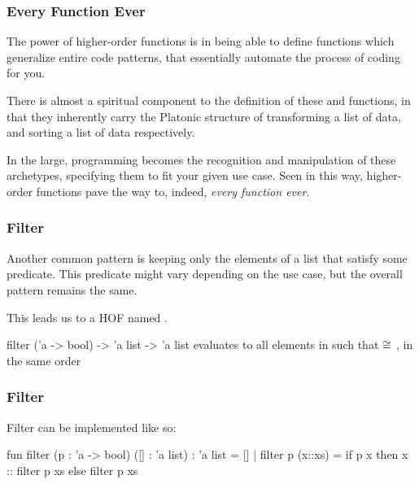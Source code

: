 \documentclass[aspectratio=169]{beamer}
\begin{document}
\begin{frame}[fragile]
  \frametitle{Every Function Ever}

  The power of higher-order functions is in being able to define functions
  which generalize entire code patterns, that essentially automate the process
  of coding for you.

  \pause
  \vspace{\fill}

  There is almost a spiritual component to the definition of these
   and  functions, in that they inherently carry the
  Platonic structure of transforming a list of data, and sorting a list of
  data respectively.

  \pause
  \vspace{\fill}

  In the large, programming becomes the recognition and manipulation of these
  archetypes, specifying them to fit your given use case. Seen in this way,
  higher-order functions pave the way to, indeed, \textit{every function ever}.
\end{frame}


\begin{frame}[fragile]
  \frametitle{Filter}

  Another common pattern is keeping only the elements of a list that satisfy
  some predicate. This predicate might vary depending on the use case, but
  the overall pattern remains the same.

  \pause
  \vspace{\fill}

  This leads us to a HOF named .

  \pause
  \vspace{\fill}

  \spec
    {filter}
    {('a -> bool) -> 'a list -> 'a list}
    {}
    { evaluates to all elements  in 
    such that  $\cong$ , in the same order}
\end{frame}

\begin{frame}[fragile]
  \frametitle{Filter}

  Filter can be implemented like so:

  \pause
  \begin{codeblock}
    fun filter (p : 'a -> bool) ([] : 'a list) : 'a list = []
      | filter p (x::xs) =
          if p x then
            x :: filter p xs
          else
            filter p xs
  \end{codeblock}
\end{frame}
\end{document}
